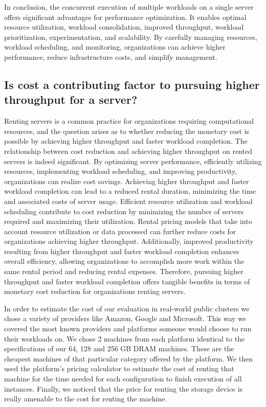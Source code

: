In conclusion, the concurrent execution of multiple workloads on
a single server offers significant advantages for performance
optimization. It enables optimal resource utilization, workload
consolidation, improved throughput, workload prioritization,
experimentation, and scalability. By carefully managing resources,
workload scheduling, and monitoring, organizations can achieve higher
performance, reduce infrastructure costs, and simplify management.

\subsection{Is cost a contributing factor to pursuing higher
throughput for a server?}
Renting servers is a common practice for organizations requiring
computational resources, and the question arises as to whether
reducing the monetary cost is possible by achieving higher throughput
and faster workload completion. The relationship between cost
reduction and achieving higher throughput on rented servers is indeed
significant. By optimizing server performance, efficiently utilizing
resources, implementing workload scheduling, and improving
productivity, organizations can realize cost savings. Achieving higher
throughput and faster workload completion can lead to a reduced rental
duration, minimizing the time and associated costs of server usage.
Efficient resource utilization and workload scheduling contribute to
cost reduction by minimizing the number of servers required and
maximizing their utilization. Rental pricing models that take into
account resource utilization or data processed can further reduce
costs for organizations achieving higher throughput. Additionally,
improved productivity resulting from higher throughput and faster
workload completion enhances overall efficiency, allowing
organizations to accomplish more work within the same rental period
and reducing rental expenses. Therefore, pursuing higher throughput
and faster workload completion offers tangible benefits in terms of
monetary cost reduction for organizations renting servers. 
\par In order to estimate the cost of our evaluation in real-world public clusters we
chose a variety of providers like Amazon, Google and Microsoft. This
way we covered the most known providers and platforms someone would
choose to run their workloads on. We chose 2 machines from each
platform identical to the specifications of our 64, 128 and 256 GB DRAM
machines. These are the cheapest machines of that particular category
offered by the platform. We then used the platform's pricing
calculator to estimate the cost of renting that machine for the time
needed for each configuration to finish execution of all instances. Finally, we noticed that the price for
renting the storage device is really amenable to the cost for renting the machine.
